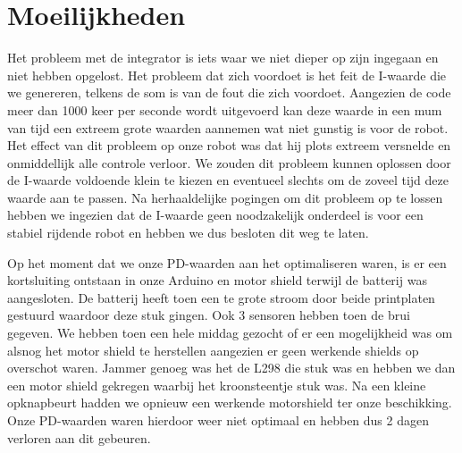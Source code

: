 \chapter{Moeilijkheden}
Het probleem met de integrator is iets waar we niet dieper op zijn ingegaan en niet hebben opgelost. Het probleem dat zich voordoet is het feit de I-waarde die we genereren, telkens de som is van de fout die zich voordoet. Aangezien de code meer dan 1000 keer per seconde wordt uitgevoerd kan deze waarde in een mum van tijd een extreem grote waarden aannemen wat niet gunstig is voor de robot. Het effect van dit probleem op onze robot was dat hij plots extreem versnelde en onmiddellijk alle controle verloor. We zouden dit probleem kunnen oplossen door de I-waarde voldoende klein te kiezen en eventueel slechts om de zoveel tijd deze waarde aan te passen. Na herhaaldelijke pogingen om dit probleem op te lossen hebben we ingezien dat de I-waarde geen noodzakelijk onderdeel is voor een stabiel rijdende robot en hebben we dus besloten dit weg te laten.

Op het moment dat we onze PD-waarden aan het optimaliseren waren, is er een kortsluiting ontstaan in onze Arduino en motor shield terwijl de batterij was aangesloten. De batterij heeft toen een te grote stroom door beide printplaten gestuurd waardoor deze stuk gingen. Ook 3 sensoren hebben toen de brui gegeven. We hebben toen een hele middag gezocht of er een mogelijkheid was om alsnog het motor shield te herstellen aangezien er geen werkende shields op overschot waren. Jammer genoeg was het de L298 die stuk was en hebben we dan een motor shield gekregen waarbij het kroonsteentje stuk was. Na een kleine opknapbeurt hadden we opnieuw een werkende motorshield ter onze beschikking. Onze PD-waarden waren hierdoor weer niet optimaal en hebben dus 2 dagen verloren aan dit gebeuren.

